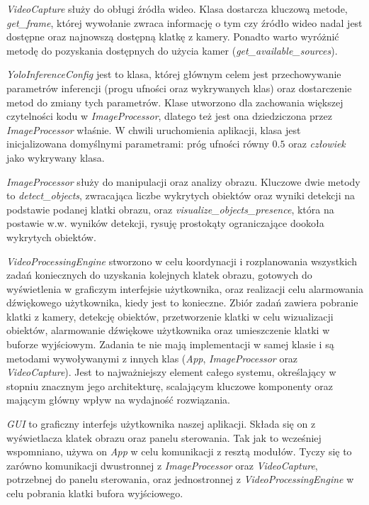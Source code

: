 \emph{VideoCapture} służy do obługi źródła wideo. Klasa dostarcza kluczową metode, \emph{get\_frame}, której wywołanie zwraca informację o tym czy źródło wideo nadal jest dostępne oraz najnowszą dostępną klatkę z kamery. Ponadto warto wyróżnić metodę do pozyskania dostępnych do użycia kamer (\emph{get\_available\_sources}).

\emph{YoloInferenceConfig} jest to klasa, której głównym celem jest przechowywanie parametrów inferencji (progu ufności oraz wykrywanych klas) oraz dostarczenie metod do zmiany tych parametrów. Klase utworzono dla zachowania większej czytelności kodu w \emph{ImageProcessor}, dlatego też jest ona dziedziczona przez \emph{ImageProcessor} właśnie. W chwili uruchomienia aplikacji, klasa jest inicjalizowana domyślnymi parametrami: próg ufności równy $0.5$ oraz \emph{człowiek} jako wykrywany klasa. 

\emph{ImageProcessor} służy do manipulacji oraz analizy obrazu. Kluczowe dwie metody to \emph{detect\_objects}, zwracająca liczbe wykrytych obiektów oraz wyniki detekcji na podstawie podanej klatki obrazu, oraz \emph{visualize\_objects\_presence}, która na postawie w.w. wyników detekcji, rysuję prostokąty ograniczające dookoła wykrytych obiektów.

\emph{VideoProcessingEngine} stworzono w celu koordynacji i rozplanowania wszystkich zadań koniecznych do uzyskania kolejnych klatek obrazu, gotowych do wyświetlenia w graficzym interfejsie użytkownika, oraz realizacji celu alarmowania dźwiękowego użytkownika, kiedy jest to konieczne. Zbiór zadań zawiera pobranie klatki z kamery, detekcję obiektów, przetworzenie klatki w celu wizualizacji obiektów, alarmowanie dźwiękowe użytkownika oraz umieszczenie klatki w buforze wyjściowym. Zadania te nie mają implementacji w samej klasie i są metodami wywoływanymi z innych klas (\emph{App}, \emph{ImageProcessor} oraz \emph{VideoCapture}). Jest to najważniejszy element całego systemu, określający w stopniu znacznym jego architekturę, scalającym kluczowe komponenty oraz mającym główny wpływ na wydajność rozwiązania.

\emph{GUI} to graficzny interfejs użytkownika naszej aplikacji. Składa się on z wyświetlacza klatek obrazu oraz panelu sterowania. Tak jak to wcześniej wspomniano, używa on \emph{App} w celu komunikacji z resztą modułów. Tyczy się to zarówno komunikacji dwustronnej z \emph{ImageProcessor} oraz \emph{VideoCapture}, potrzebnej do panelu sterowania, oraz jednostronnej z \emph{VideoProcessingEngine} w celu pobrania klatki bufora wyjściowego.  


